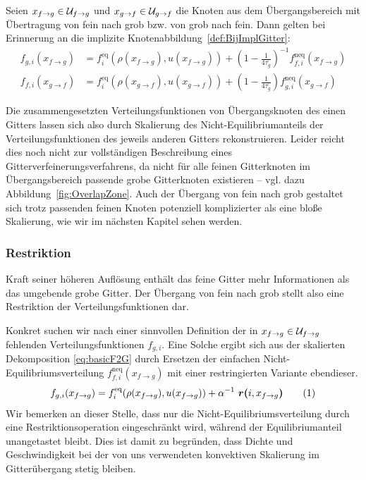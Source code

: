 \bigskip

Seien \(x_{f \to g} \in \mathcal{U}_{f \to g}\) und \(x_{g \to f} \in \mathcal{U}_{g \to f}\) die Knoten aus dem Übergangsbereich mit Übertragung von fein nach grob bzw. von grob nach fein. Dann gelten bei Erinnerung an die implizite Knotenabbildung~\ref{def:BijImplGitter}:
\begin{align}
f_{g,i}(x_{f \to g}) &= f_i^\text{eq}(\rho(x_{f \to g}), u(x_{f \to g})) + \left(1-\frac{1}{4\overline{\tau_g}}\right)^{-1} f_{f,i}^\text{neq}(x_{f \to g}) \label{eq:basicF2G} \\
f_{f,i}(x_{g \to f}) &= f_i^\text{eq}(\rho(x_{g \to f}), u(x_{g \to f})) + \left(1-\frac{1}{4\overline{\tau_g}}\right) f_{g,i}^\text{neq}(x_{g \to f}) \label{eq:basicG2F}
\end{align}

Die zusammengesetzten Verteilungsfunktionen von Übergangsknoten des einen Gitters lassen sich also durch Skalierung des Nicht-Equilibriumanteils der Verteilungsfunktionen des jeweils anderen Gitters rekonstruieren. Leider reicht dies noch nicht zur vollständigen Beschreibung eines Gitterverfeinerungsverfahrens, da nicht für alle feinen Gitterknoten im Übergangsbereich passende grobe Gitterknoten existieren -- vgl. dazu Abbildung~\ref{fig:OverlapZone}. Auch der Übergang von fein nach grob gestaltet sich trotz passenden feinen Knoten potenziell komplizierter als eine bloße Skalierung, wie wir im nächsten Kapitel sehen werden.

\newpage
\subsubsection{Restriktion}

Kraft seiner höheren Auflösung enthält das feine Gitter mehr Informationen als das umgebende grobe Gitter. Der Übergang von fein nach grob stellt also eine Restriktion der Verteilungsfunktionen dar.

Konkret suchen wir nach einer sinnvollen Definition der in \(x_{f \to g} \in \mathcal{U}_{f \to g}\) fehlenden Verteilungsfunktionen \(f_{g,i}\). Eine Solche ergibt sich aus der skalierten Dekomposition \ref{eq:basicF2G} durch Ersetzen der einfachen Nicht-Equilibriumsverteilung \(f_{f,i}^\text{neq}(x_{f \to g})\) mit einer restringierten Variante ebendieser.
\[f_{g,i}(x_{f \to g}) = f_i^\text{eq}(\rho(x_{f \to g}), u(x_{f \to g})) + \alpha^{-1} \ \resarg{i}{x_{f \to g}} \numberthis\label{eq:restrictedF2G}\]
Wir bemerken an dieser Stelle, dass nur die Nicht-Equilibriumsverteilung durch eine Restriktionsoperation eingeschränkt wird, während der Equilibriumanteil unangetastet bleibt. Dies ist damit zu begründen, dass Dichte und Geschwindigkeit bei der von uns verwendeten konvektiven Skalierung im Gitterübergang stetig bleiben.

